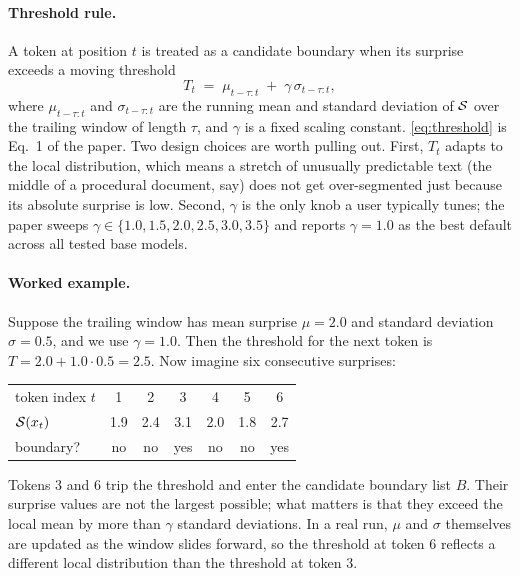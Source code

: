 \paragraph{Threshold rule.}
A token at position $t$ is treated as a candidate boundary when its surprise exceeds a moving threshold
\begin{equation}
  T_t \;=\; \mu_{t-\tau:t} \;+\; \gamma \, \sigma_{t-\tau:t},
  \label{eq:threshold}
\end{equation}
where $\mu_{t-\tau:t}$ and $\sigma_{t-\tau:t}$ are the running mean and standard deviation of $\mathcal{S}$ over the trailing window of length $\tau$, and $\gamma$ is a fixed scaling constant. \cref{eq:threshold} is Eq.\ 1 of the paper. Two design choices are worth pulling out. First, $T_t$ adapts to the local distribution, which means a stretch of unusually predictable text (the middle of a procedural document, say) does not get over-segmented just because its absolute surprise is low. Second, $\gamma$ is the only knob a user typically tunes; the paper sweeps $\gamma \in \{1.0, 1.5, 2.0, 2.5, 3.0, 3.5\}$ and reports $\gamma = 1.0$ as the best default across all tested base models.

\paragraph{Worked example.}
Suppose the trailing window has mean surprise $\mu = 2.0$ and standard deviation $\sigma = 0.5$, and we use $\gamma = 1.0$. Then the threshold for the next token is $T = 2.0 + 1.0 \cdot 0.5 = 2.5$. Now imagine six consecutive surprises:
\begin{center}
\begin{tabular}{lcccccc}
  \toprule
  token index $t$    & 1   & 2   & 3   & 4   & 5   & 6 \\
  $\mathcal{S}(x_t)$   & 1.9 & 2.4 & 3.1 & 2.0 & 1.8 & 2.7 \\
  boundary?          & no  & no  & yes & no  & no  & yes \\
  \bottomrule
\end{tabular}
\end{center}
Tokens 3 and 6 trip the threshold and enter the candidate boundary list $B$. Their surprise values are not the largest possible; what matters is that they exceed the local mean by more than $\gamma$ standard deviations. In a real run, $\mu$ and $\sigma$ themselves are updated as the window slides forward, so the threshold at token 6 reflects a different local distribution than the threshold at token 3.

